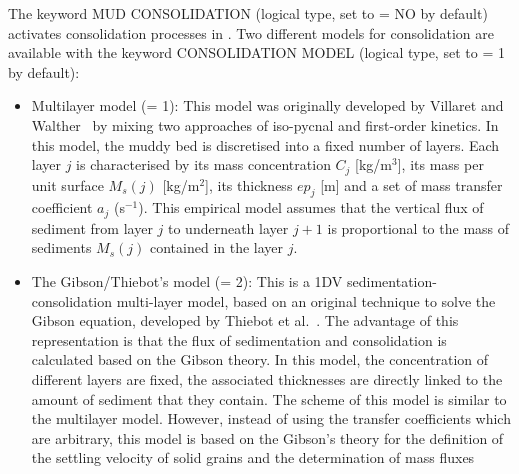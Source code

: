 The keyword {\ttfamily MUD CONSOLIDATION} (logical type, set to {\ttfamily = NO} by default) activates consolidation processes in \sisyphe{}. Two different models for consolidation are available with the keyword {\ttfamily CONSOLIDATION MODEL} (logical type, set to {\ttfamily = 1} by default):
\begin{itemize}
\item Multilayer model ({\ttfamily = 1}): This model was originally developed by Villaret and Walther~\cite{} by mixing two
approaches of iso-pycnal and first-order kinetics. In this model, the muddy bed is discretised into a fixed number of layers.
Each layer $j$ is characterised by its mass concentration $C_j$ [kg/m$^3$], its mass per unit surface $M_s(j)$
[kg/m$^2$], its thickness $ep_j$ [m] and a set of mass transfer coefficient $a_j$ (s$^{-1}$). This empirical model assumes that the vertical flux of
sediment from layer $j$ to underneath layer $j+1$ is proportional to the mass of sediments $M_s(j)$ contained in the layer $j$.

\item The Gibson/Thiebot's model ({\ttfamily = 2}): This is a 1DV sedimentation-consolidation multi-layer model, based on an original
technique to solve the Gibson equation, developed by Thiebot et al.~\cite{thiebot08}. The advantage of
this representation is that the flux of sedimentation and consolidation is calculated based on
the Gibson theory. In this model, the concentration of different layers are fixed, the associated thicknesses are directly
linked to the amount of sediment that they contain. The scheme of this model is similar to the multilayer model.
However, instead of using the transfer coefficients which are
arbitrary, this model is based on the Gibson's theory for the definition of the settling velocity
of solid grains and the determination of mass fluxes
\end{itemize}

